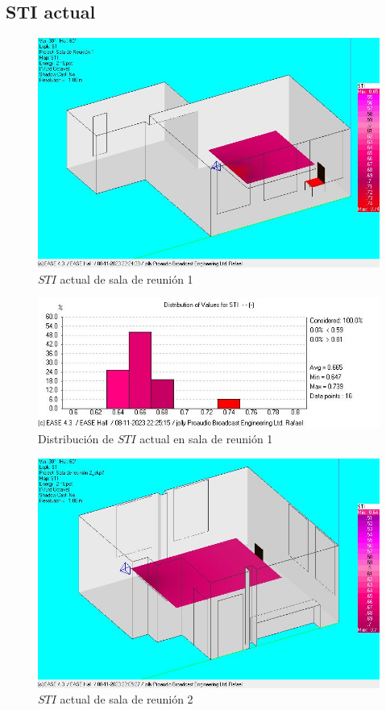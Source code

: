 \subsection{STI actual}\label{subsecc: STI salas actual}
\begin{figure}[H]
    \centering
    \includegraphics[width=12cm]{Imagenes/STI actual/STI_Reunion1_SinAcond.jpg}
    \caption{$STI$ actual de sala de reunión 1}
    \label{fig: STI sala1 actual}
\end{figure}
\begin{figure}[H]
    \centering
    \includegraphics[width=12cm]{Imagenes/STI actual/STIdist_Reunion1_SinAcond.jpg}
    \caption{Distribución de $STI$ actual en sala de reunión 1}
    \label{fig: distribucion STI sala1 actual}
\end{figure}
\begin{figure}[H]
    \centering
    \includegraphics[width=12cm]{Imagenes/STI actual/STI_Reunion2_SinAcond.jpg}
    \caption{$STI$ actual de sala de reunión 2}
    \label{fig: STI sala2 actual}
\end{figure}
